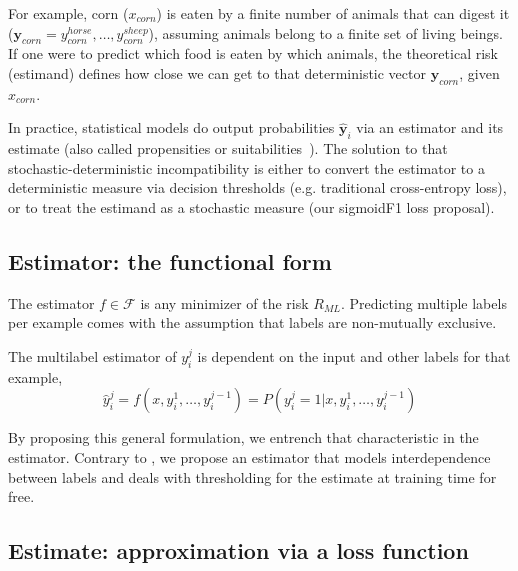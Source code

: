 For example, corn ($x_{corn}$) is eaten by a finite number of animals that can digest it ($\mathbf{y}_{corn} = {y_{corn}^{horse}, \ldots, y_{corn}^{sheep}} $), assuming animals belong to a finite set of living beings. If one were to predict which food is eaten by which animals, the theoretical risk (estimand) defines how close we can get to that deterministic vector $\mathbf{y}_{corn}$, given $x_{corn}$.
\fi

In practice, statistical models do output probabilities $\mathbf{\hat{y}}_{i}$ via an estimator and its estimate (also called propensities or suitabilities~\citep{multilabelReduction}). The solution to that stochastic-deterministic incompatibility is either to convert the estimator to a deterministic measure via decision thresholds (e.g. traditional cross-entropy loss), or to treat the estimand as a stochastic measure (our sigmoidF1 loss proposal).

\subsection{Estimator: the functional form}
\label{section:background:estimator}

The estimator $f \in \mathcal{F}$ is any minimizer of the risk $R_{ML}$. Predicting multiple labels per example comes with the assumption that labels are non-mutually exclusive.

\vspace{-.5\baselineskip}
\begin{proposition}
  The multilabel estimator of $y_{i}^{j}$ is dependent on the input and other labels for that example,
%
\begin{equation}
  \hat{y}_i^j = f(x, y_{i}^{1}, \ldots, y_{i}^{j-1}) = P(y_i^j = 1 | x, y_{i}^{1}, \ldots, y_{i}^{j-1})
\end{equation}
\label{eq:estimator}
\end{proposition}
\vspace{-1.5\baselineskip}
%
 By proposing this general formulation, we entrench that characteristic in the estimator. Contrary to \citet{multilabelReduction}, we propose an estimator that models interdependence between labels and deals with thresholding for the estimate at training time for free.


\subsection{Estimate: approximation via a loss function}
\label{section:background:estimate}

